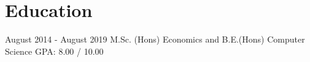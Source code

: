 \section{Education}\label{sec:education}
\resumeSubHeadingListStart
{} {August 2014 - August 2019} {M.Sc. (Hons) Economics and B.E.(Hons) Computer Science} {GPA: 8.00 / 10.00}
\resumeSubHeadingListEnd
